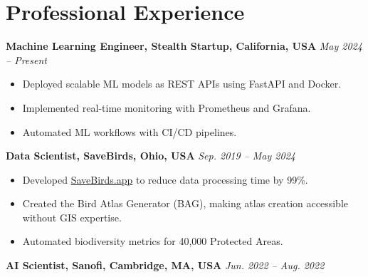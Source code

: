 \documentclass[a4paper,10pt]{article}
\begin{document}
\section*{Professional Experience}

\vspace{6pt}
\hspace{3mm} \textbf{Machine Learning Engineer, Stealth Startup, California, USA} \hfill \textit{May 2024 -- Present}

\begin{itemize}

    \item Deployed scalable ML models as REST APIs using FastAPI and Docker.
    
    \item Implemented real-time monitoring with Prometheus and Grafana.
    
    \item Automated ML workflows with CI/CD pipelines.

\end{itemize}

\vspace{6pt}
\hspace{3mm} \textbf{Data Scientist, SaveBirds, Ohio, USA} \hfill \textit{Sep. 2019 -- May 2024}

\begin{itemize}

    \item Developed \href{http://www.savebirds.app}{SaveBirds.app} to reduce data processing time by 99\%.
    
    \item Created the Bird Atlas Generator (BAG), making atlas creation accessible without GIS expertise.
    
    \item Automated biodiversity metrics for 40,000 Protected Areas.

\end{itemize}

\vspace{6pt}
\hspace{3mm} \textbf{AI Scientist, Sanofi, Cambridge, MA, USA} \hfill \textit{Jun. 2022 -- Aug. 2022}
\end{document}

